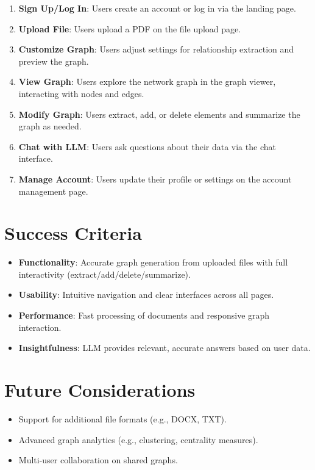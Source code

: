 \documentclass[%
 reprint,
 amsmath,amssymb,
 aps,
]{revtex4-2}
\begin{document}
\begin{enumerate}
\item \textbf{Sign Up/Log In}: Users create an account or log in via the landing page.
\item \textbf{Upload File}: Users upload a PDF on the file upload page.
\item \textbf{Customize Graph}: Users adjust settings for relationship extraction and preview the graph.
\item \textbf{View Graph}: Users explore the network graph in the graph viewer, interacting with nodes and edges.
\item \textbf{Modify Graph}: Users extract, add, or delete elements and summarize the graph as needed.
\item \textbf{Chat with LLM}: Users ask questions about their data via the chat interface.
\item \textbf{Manage Account}: Users update their profile or settings on the account management page.
\end{enumerate}

\section{\label{sec:success_criteria}Success Criteria}

\begin{itemize}
\item \textbf{Functionality}: Accurate graph generation from uploaded files with full interactivity (extract/add/delete/summarize).
\item \textbf{Usability}: Intuitive navigation and clear interfaces across all pages.
\item \textbf{Performance}: Fast processing of documents and responsive graph interaction.
\item \textbf{Insightfulness}: LLM provides relevant, accurate answers based on user data.
\end{itemize}

\section{\label{sec:future_considerations}Future Considerations}

\begin{itemize}
\item Support for additional file formats (e.g., DOCX, TXT).
\item Advanced graph analytics (e.g., clustering, centrality measures).
\item Multi-user collaboration on shared graphs.
\end{itemize}
\end{document}
